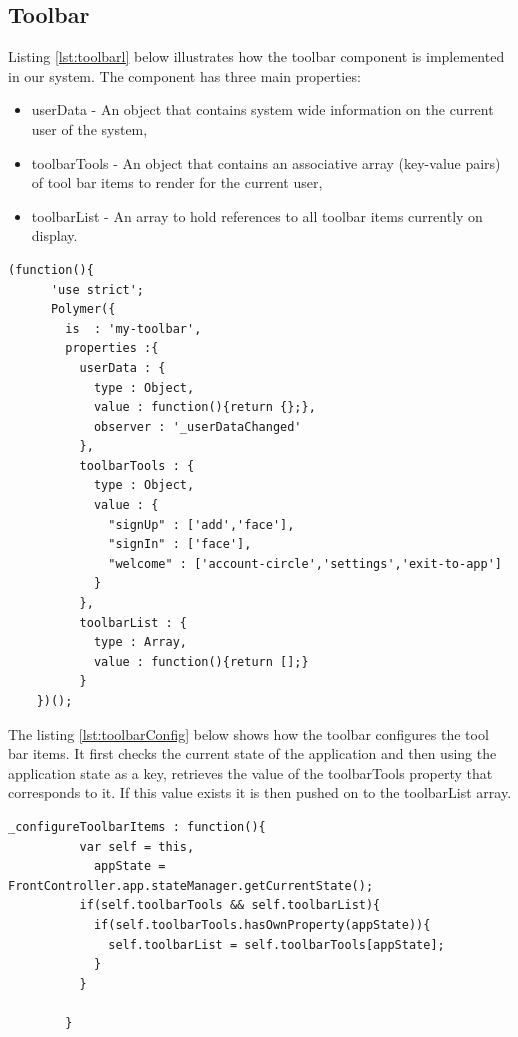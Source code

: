 \subsection{Toolbar}
Listing \ref{lst:toolbarl} below illustrates how the toolbar component is implemented in our system. The component has three main properties:
\begin{itemize}
    \item userData - An object that contains system wide information on the current user of the system,
    \item toolbarTools - An object that contains an associative array (key-value pairs) of tool bar items to render for the current user,
    \item toolbarList - An array to hold references to all toolbar items currently on display. 
\end{itemize}

\begin{lstlisting}[caption={toolbar instance}, label={lst:toolbar}]
 (function(){
      'use strict';
      Polymer({
        is  : 'my-toolbar',
        properties :{
          userData : {
            type : Object,
            value : function(){return {};},
            observer : '_userDataChanged'
          },
          toolbarTools : {
            type : Object,
            value : {
              "signUp" : ['add','face'],
              "signIn" : ['face'],
              "welcome" : ['account-circle','settings','exit-to-app']
            }
          },
          toolbarList : {
            type : Array,
            value : function(){return [];}
          }
    })();
\end{lstlisting}
The listing \ref{lst:toolbarConfig} below shows how the toolbar configures the tool bar items. It first checks the current state of the application and then using the application state as a key,  retrieves the value of the toolbarTools property that corresponds to it.
If this value exists it is then pushed on to the toolbarList array.
\begin{lstlisting}[caption={Configuring toolbar items}, label={lst:toolbarConfig}]
_configureToolbarItems : function(){
          var self = this,
            appState = FrontController.app.stateManager.getCurrentState();
          if(self.toolbarTools && self.toolbarList){
            if(self.toolbarTools.hasOwnProperty(appState)){
              self.toolbarList = self.toolbarTools[appState];
            }
          }

        }
\end{lstlisting}



